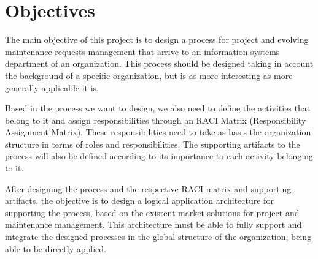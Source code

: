 
% 
% 

\section{Objectives}

The main objective of this project is to design a process for project and evolving maintenance requests management that arrive to an information systems department of an organization. This process should be designed taking in account the background of a specific organization, but is as more interesting as more generally applicable it is.\par
Based in the process we want to design, we also need to define the activities that belong to it and assign responsibilities through an RACI Matrix (Responsibility Assignment Matrix). These responsibilities need to take as basis the organization structure in terms of roles and responsibilities. The supporting artifacts to the process will also be defined according to its importance to each activity belonging to it.\par
After designing the process and the respective RACI matrix and supporting artifacts, the objective is to design a logical application architecture for supporting the process, based on the existent market solutions for project and maintenance management. This architecture must be able to fully support and integrate the designed processes in the global structure of the organization, being able to be directly applied.
